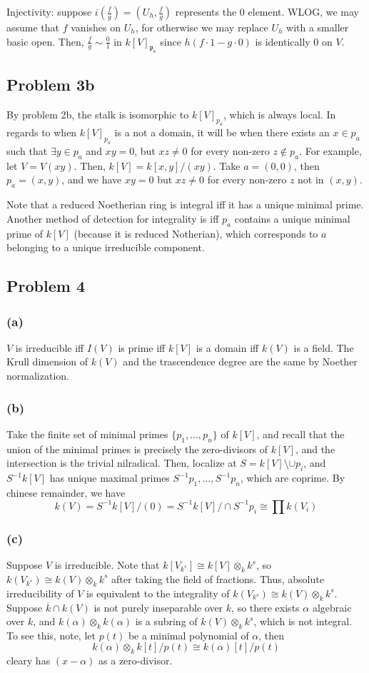 \documentclass{article}
\theoremstyle{definition}
\theoremstyle{definition}
\theoremstyle{definition}
\theoremstyle{definition}
\theoremstyle{definition}
\theoremstyle{definition}
\theoremstyle{definition}
\begin{document}
Injectivity: suppose $i(\frac{f}{g})=(U_h,\frac{f}{g})$ represents the $0$ element. WLOG, we may assume that $f$ vanishes on $U_h$, for otherwise we may replace $U_h$ with a smaller basic open. Then, $\frac{f}{g}\sim \frac{0}{1}$ in $ k[V]_{\mathfrak{p}_a}$ since $h(f\cdot 1-g\cdot 0)$ is identically $0$ on $V$.

\subsection*{Problem 3b}
By problem 2b, the stalk is isomorphic to $k[V]_{p_a}$, which is always local. In regards to when $k[V]_{p_a}$ is a not a domain, it will be when there exists an $x\in p_a$ such that $\exists y\in p_a$ and $xy=0$, but $xz\neq 0$ for every non-zero $z\not \in p_a$. For example, let $V=V(xy)$. Then, $k[V]=k[x,y]/(xy)$. Take $a=(0,0)$, then $p_a=(x,y)$, and we have $xy=0$ but $xz\neq 0$ for every non-zero $z$ not in $(x,y)$. 

Note that a reduced Noetherian ring is integral iff it has a unique minimal prime. Another method of detection for integrality is iff $p_a$ contains a unique minimal prime of $k[V]$ (because it is reduced Notherian), which corresponds to $a$ belonging to a unique irreducible component.

\subsection*{Problem 4}
\subsubsection*{(a)}
$V$ is irreducible iff $I(V)$ is prime iff $k[V]$ is a domain iff $k(V)$ is a field. The Krull dimension of $k(V)$ and the trascendence degree are the same by Noether normalization.
\subsubsection*{(b)}
Take the finite set of minimal primes $\{p_1,...,p_n\}$ of $k[V]$, and recall that the union of the minimal primes is precisely the zero-divisors of $k[V]$, and the intersection is the trivial nilradical. Then, localize at $S=k[V]\setminus \cup p_i$, and $S^{-1}k[V]$ has unique maximal primes $S^{-1}p_1,...,S^{-1}p_n$, which are coprime. By chinese remainder, we have
\[k(V)=S^{-1}k[V]/(0)=S^{-1}k[V]/\cap S^{-1}p_i\cong \prod k(V_i)  \]
\subsubsection*{(c)}
Suppose $V$ is irreducible. Note that $k[V_{k^s}]\cong k[V]\otimes_k k^s$, so $k(V_{k^s})\cong k(V)\otimes_k k^s$ after taking the field of fractions. Thus, absolute irreducibility of $V$ is equivalent to the integrality of $k(V_{k^s})\cong k(V)\otimes_k k^s$. Suppose $\overline{k}\cap k(V)$ is not purely inseparable over $k$, so there exists $\alpha$ algebraic over $k$, and $k(\alpha)\otimes_k k(\alpha)$ is a subring of $k(V)\otimes_k k^s$, which is not integral. To see this, note, let $p(t)$ be a minimal polynomial of $\alpha$, then
\[k(\alpha)\otimes_k k[t]/p(t)\cong k(\alpha)[t]/p(t)\]
cleary has $(x-\alpha)$ as a zero-divisor. 
\end{document}
